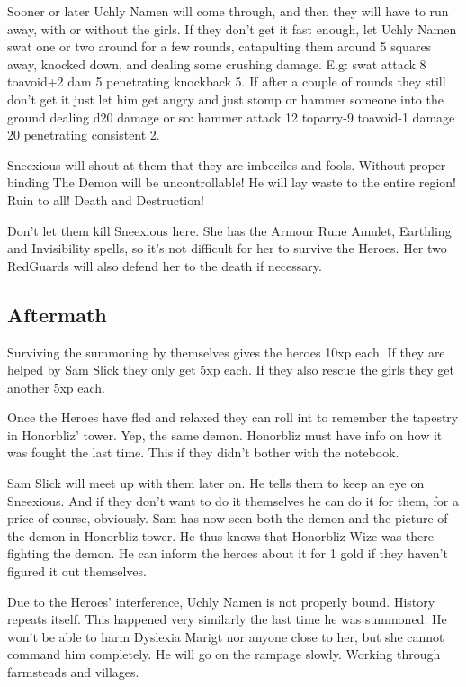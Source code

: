 \documentclass[11pt, twoside, titlepage, a4paper]{report}
\begin{document}
Sooner or later Uchly Namen will come through, and then they will have to run away, with or without the girls. If they don't get it fast enough, let Uchly Namen swat one or two around for a few rounds, catapulting them around 5 squares away, knocked down, and dealing some crushing damage. E.g: swat attack 8 toavoid+2 dam 5 penetrating knockback 5. If after a couple of rounds they still don't get it just let him get angry and just stomp or hammer someone into the ground dealing d20 damage or so: hammer attack 12 toparry-9 toavoid-1 damage 20 penetrating consistent 2.

Sneexious will shout at them that they are imbeciles and fools. Without proper binding The Demon will be uncontrollable! He will lay waste to the entire region! Ruin to all! Death and Destruction!

Don't let them kill Sneexious here. She has the Armour Rune Amulet, Earthling and Invisibility spells, so it's not difficult for her to survive the Heroes. Her two RedGuards will also defend her to the death if necessary.


\subsection*{Aftermath}
Surviving the summoning by themselves gives the heroes 10xp each. If they are helped by Sam Slick they only get 5xp each. If they also rescue the girls they get another 5xp each.

Once the Heroes have fled and relaxed they can roll int to remember the tapestry in Honorbliz' tower. Yep, the same demon. Honorbliz must have info on how it was fought the last time. This if they didn't bother with the notebook.

Sam Slick will meet up with them later on. He tells them to keep an eye on Sneexious. And if they don't want to do it themselves he can do it for them, for a price of course, obviously.
Sam has now seen both the demon and the picture of the demon in Honorbliz tower. He thus knows that Honorbliz Wize was there fighting the demon. He can inform the heroes about it for 1 gold if they haven't figured it out themselves.

Due to the Heroes' interference, Uchly Namen is not properly bound. History repeats itself. This happened very similarly the last time he was summoned.
He won't be able to harm Dyslexia Marigt nor anyone close to her, but she cannot command him completely.
He will go on the rampage slowly. Working through farmsteads and villages.
\end{document}
